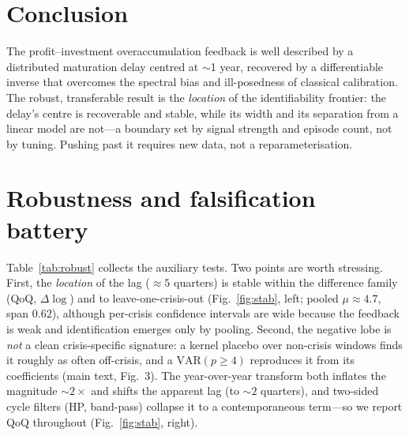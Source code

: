 \documentclass[11pt]{article}
\begin{document}
\section{Conclusion}
The profit--investment overaccumulation feedback is well described by a distributed maturation
delay centred at $\sim$1 year, recovered by a differentiable inverse that overcomes the spectral
bias and ill-posedness of classical calibration. The robust, transferable result is the
\emph{location} of the identifiability frontier: the delay's centre is recoverable and stable,
while its width and its separation from a linear model are not---a boundary set by signal strength
and episode count, not by tuning. Pushing past it requires new data, not a reparameterisation.

\appendix

\section{Robustness and falsification battery}
\label{app:robust}
Table~\ref{tab:robust} collects the auxiliary tests. Two points are worth stressing. First, the
\emph{location} of the lag ($\approx\!5$ quarters) is stable within the difference family
(QoQ, $\Delta\log$) and to leave-one-crisis-out (Fig.~\ref{fig:stab}, left; pooled
$\mu\approx4.7$, span $0.62$), although per-crisis confidence intervals are wide because the
feedback is weak and identification emerges only by pooling. Second, the negative lobe is
\emph{not} a clean crisis-specific signature: a kernel placebo over non-crisis windows finds it
roughly as often off-crisis, and a $\mathrm{VAR}(p\!\ge\!4)$ reproduces it from its coefficients
(main text, Fig.~3). The year-over-year transform both inflates the magnitude $\sim2\times$ and
shifts the apparent lag (to $\sim2$ quarters), and two-sided cycle filters (HP, band-pass)
collapse it to a contemporaneous term---so we report QoQ throughout (Fig.~\ref{fig:stab}, right).
\end{document}
